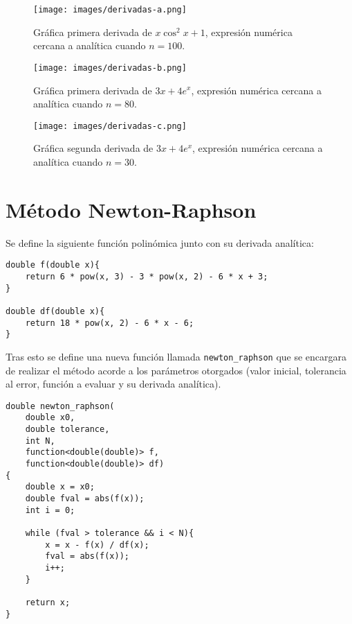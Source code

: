 \documentclass[10pt]{article}
\begin{document}
    \begin{figure}[H]
        \centering
        \texttt{[image: images/derivadas-a.png]}
        \caption{Gráfica primera derivada de $x\cos^2 x + 1$, expresión numérica cercana a analítica cuando $n=100$.}
        \label{img}
    \end{figure}
    
    \begin{figure}[H]
        \centering
        \texttt{[image: images/derivadas-b.png]}
        \caption{Gráfica primera derivada de $3x + 4 e^x$, expresión numérica cercana a analítica cuando $n=80$.}
        \label{img}
    \end{figure}
    
    \begin{figure}[H]
        \centering
        \texttt{[image: images/derivadas-c.png]}
        \caption{Gráfica segunda derivada de $3x + 4 e^x$, expresión numérica cercana a analítica cuando $n=30$.}
        \label{img}
    \end{figure}
    
    
    \section{Método Newton-Raphson}
    Se define la siguiente función polinómica junto con su derivada analítica:
    
    \begin{verbatim}
double f(double x){
    return 6 * pow(x, 3) - 3 * pow(x, 2) - 6 * x + 3;
}

double df(double x){
    return 18 * pow(x, 2) - 6 * x - 6;
}
    \end{verbatim}
    
    Tras esto se define una nueva función llamada \texttt{newton\_raphson} que se encargara de realizar el método acorde a los parámetros otorgados (valor inicial, tolerancia al error, función a evaluar y su derivada analítica).
    
    \begin{verbatim}
double newton_raphson(
    double x0,
    double tolerance,
    int N,
    function<double(double)> f,
    function<double(double)> df) 
{
    double x = x0;
    double fval = abs(f(x));
    int i = 0;

    while (fval > tolerance && i < N){
        x = x - f(x) / df(x);
        fval = abs(f(x));
        i++;
    }

    return x;
}
    \end{verbatim}
    
\end{document}
